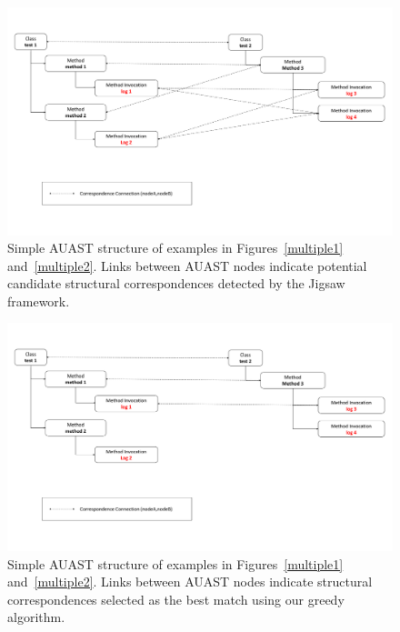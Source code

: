 \begin{figure} [H]
  \centering\includegraphics [width = \textwidth]{Drawing4/multipleLogging.pdf}
  \caption{Simple AUAST structure of examples in Figures~\ref{multiple1} and~\ref{multiple2}. Links between AUAST nodes indicate potential candidate structural correspondences detected by the Jigsaw framework.}
  \label{mast_1}
\end{figure}


\begin{figure} [H]
  \centering\includegraphics [width = \textwidth]{Drawing4/multipleLogging2.pdf}
  \caption{Simple AUAST structure of examples in Figures~\ref{multiple1} and~\ref{multiple2}. Links between AUAST nodes indicate structural correspondences selected as the best match using our greedy algorithm.}
  \label{m_ast2}
\end{figure}
 
